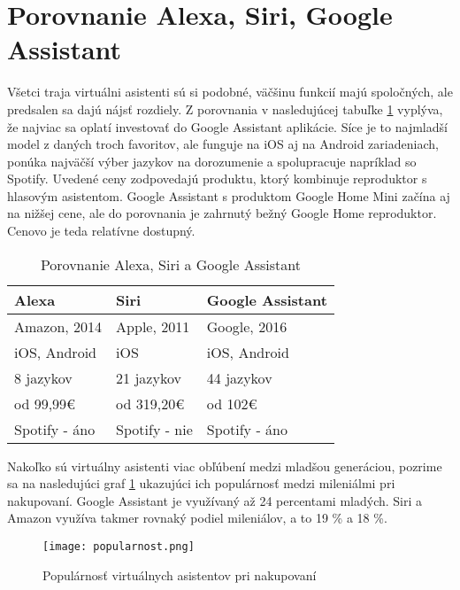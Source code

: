 \documentclass[10pt,twoside,slovak,coursepaper]{article}
\begin{document}
\section{Porovnanie Alexa, Siri, Google Assistant}
Všetci traja virtuálni asistenti sú si podobné, väčšinu funkcií majú spoločných, ale predsalen sa dajú nájsť rozdiely. Z porovnania v nasledujúcej tabuľke \ref{tabuľka} vyplýva, že najviac sa oplatí investovať do Google Assistant aplikácie. Síce je to najmladší model z daných troch favoritov, ale funguje na iOS aj na Android zariadeniach, ponúka najväčší výber jazykov na dorozumenie a spolupracuje napríklad so Spotify.\cite{Strephon} Uvedené ceny zodpovedajú produktu, ktorý kombinuje reproduktor s hlasovým asistentom. Google Assistant s produktom Google Home Mini začína aj na nižšej cene, ale do porovnania je zahrnutý bežný Google Home reproduktor. \cite{Statik} Cenovo je teda relatívne dostupný. 

\begin{table}[H]
\centering
\begin{tabular}{|l|l|l|}
\hline
\rowcolor[HTML]{B74C79} 
\textbf{Alexa} & \textbf{Siri} & \textbf{Google Assistant} \\ \hline
\rowcolor[HTML]{EDDBE3} 
Amazon, 2014   & Apple, 2011   & Google, 2016              \\ \hline
\rowcolor[HTML]{EDDBE3} 
iOS, Android   & iOS           & iOS, Android              \\ \hline
\rowcolor[HTML]{EDDBE3} 
8 jazykov      & 21 jazykov    & 44 jazykov                \\ \hline
\rowcolor[HTML]{EDDBE3} 
od 99,99€      & od 319,20€    & od 102€                   \\ \hline
\rowcolor[HTML]{EDDBE3} 
Spotify - áno  & Spotify - nie & Spotify - áno             \\ \hline
\end{tabular}
\caption{Porovnanie Alexa, Siri a Google Assistant \cite{Statik}}
\label{tabuľka}
\end{table}

Nakoľko sú virtuálny asistenti viac obľúbení medzi mladšou generáciou, pozrime sa na nasledujúci graf \ref{populárnosť} ukazujúci ich populárnosť medzi mileniálmi pri nakupovaní. Google Assistant je využívaný až 24 percentami mladých. Siri a Amazon využíva takmer rovnaký podiel mileniálov, a to 19 \% a 18 \%. \cite{Kinsella}
\begin{figure}[H]
\centering
\texttt{[image: popularnost.png]}
\caption {Populárnosť virtuálnych asistentov pri nakupovaní \cite{Kinsella}}
\label{populárnosť}
\end{figure}
\end{document}
